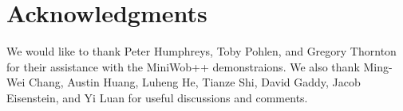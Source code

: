 \section*{Acknowledgments}
We would like to thank Peter Humphreys, Toby Pohlen, and Gregory Thornton for their assistance with the MiniWob++ demonstraions. We also thank Ming-Wei Chang, Austin Huang, Luheng He, Tianze Shi, David Gaddy, Jacob Eisenstein, and Yi Luan for useful discussions and comments.
